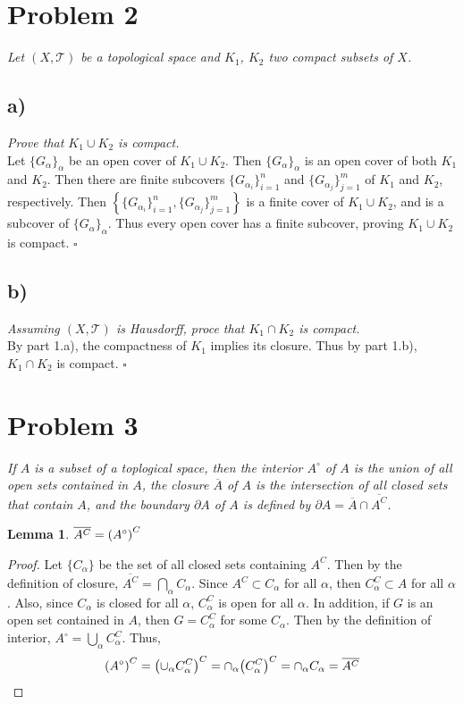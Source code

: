 \documentclass[12pt]{article}
\theoremstyle{plain}
\newtheorem{lemma}{Lemma}
\begin{document}
\section*{Problem 2}
\emph{Let $(X, \mathcal{T})$ be a topological space and $K_1$, $K_2$ two compact subsets of $X$.}

\subsection*{ a)}
\emph{Prove that $K_1 \cup K_2$ is compact.} \\

Let $\{G_\alpha\}_\alpha$ be an open cover of $K_1 \cup K_2$.  Then $\{G_\alpha\}_\alpha$ is an open cover of both $K_1$ and $K_2$.  Then there are finite subcovers $\{G_{\alpha_i}\}_{i = 1}^n$ and $\{G_{\alpha_j}\}_{j = 1}^m$ of $K_1$ and $K_2$, respectively.  Then $\left\{\{G_{\alpha_i}\}_{i = 1}^n, \{G_{\alpha_j}\}_{j = 1}^m\right\}$ is a finite cover of $K_1 \cup K_2$, and is a subcover of $\{G_{\alpha}\}_\alpha$.  Thus every open cover has a finite subcover, proving $K_1 \cup K_2$ is compact. \hfill $\square$

\subsection*{ b)}
\emph{Assuming $(X, \mathcal{T})$ is Hausdorff, proce that $K_1 \cap K_2$ is compact.} \\

By part 1.a), the compactness of $K_1$ implies its closure.  Thus by part 1.b), $K_1 \cap K_2$ is compact. \hfill $\square$

\section*{Problem 3}
\emph{If $A$ is a subset of a toplogical space, then the \emph{interior} $A^\circ$ of $A$ is the union of all open sets contained in $A$, the \emph{closure} $\overline{A}$ of $A$ is the intersection of all closed sets that contain $A$, and the \emph{boundary} $\partial A$ of $A$ is defined by $\partial A = \overline{A} \cap \overline{A^C}$.}

\begin{lemma}
    \label{awesome_lemma}
    $\overline{A^C} = \qty(A^\circ)^C$
\end{lemma}
\begin{proof}
    Let $\{C_\alpha\}$ be the set of all closed sets containing $A^C$.  Then by the definition of closure, $\overline{A^C} = \bigcap_\alpha C_\alpha$.  Since $A^C \subset C_\alpha$ for all $\alpha$, then $C_\alpha^C \subset A$ for all $\alpha$.  Also, since $C_\alpha$ is closed for all $\alpha$, $C_\alpha^C$ is open for all $\alpha$.  In addition, if $G$ is an open set contained in $A$, then $G = C_\alpha^C$ for some $C_\alpha$.  Then by the definition of interior, $A^\circ = \bigcup_\alpha C_\alpha^C$.  Thus,
    \begin{align*}
        \qty(A^\circ)^C = \qty(\cup_\alpha C_\alpha^C)^C = \cap_\alpha \qty(C_\alpha^C)^C = \cap_\alpha C_\alpha = \overline{A^C}
    \end{align*}
\end{proof}
\end{document}
